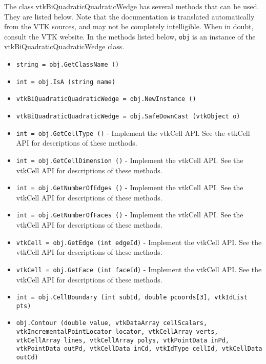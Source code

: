The class vtkBiQuadraticQuadraticWedge has several methods that can be used.
  They are listed below.
Note that the documentation is translated automatically from the VTK sources,
and may not be completely intelligible.  When in doubt, consult the VTK website.
In the methods listed below, \verb|obj| is an instance of the vtkBiQuadraticQuadraticWedge class.
\begin{itemize}
\item  \verb|string = obj.GetClassName ()|

\item  \verb|int = obj.IsA (string name)|

\item  \verb|vtkBiQuadraticQuadraticWedge = obj.NewInstance ()|

\item  \verb|vtkBiQuadraticQuadraticWedge = obj.SafeDownCast (vtkObject o)|

\item  \verb|int = obj.GetCellType ()| -  Implement the vtkCell API. See the vtkCell API for descriptions
 of these methods.

\item  \verb|int = obj.GetCellDimension ()| -  Implement the vtkCell API. See the vtkCell API for descriptions
 of these methods.

\item  \verb|int = obj.GetNumberOfEdges ()| -  Implement the vtkCell API. See the vtkCell API for descriptions
 of these methods.

\item  \verb|int = obj.GetNumberOfFaces ()| -  Implement the vtkCell API. See the vtkCell API for descriptions
 of these methods.

\item  \verb|vtkCell = obj.GetEdge (int edgeId)| -  Implement the vtkCell API. See the vtkCell API for descriptions
 of these methods.

\item  \verb|vtkCell = obj.GetFace (int faceId)| -  Implement the vtkCell API. See the vtkCell API for descriptions
 of these methods.

\item  \verb|int = obj.CellBoundary (int subId, double pcoords[3], vtkIdList pts)|

\item  \verb|obj.Contour (double value, vtkDataArray cellScalars, vtkIncrementalPointLocator locator, vtkCellArray verts, vtkCellArray lines, vtkCellArray polys, vtkPointData inPd, vtkPointData outPd, vtkCellData inCd, vtkIdType cellId, vtkCellData outCd)|


\end{itemize}

